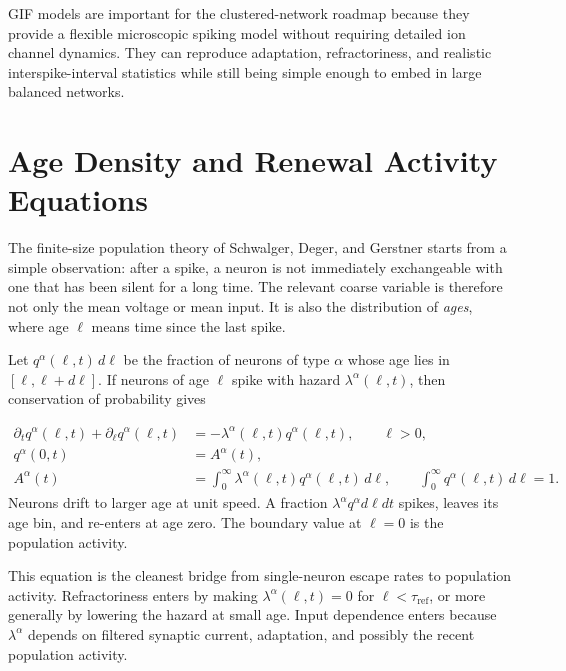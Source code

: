 GIF models are important for the clustered-network roadmap because they
provide a flexible microscopic spiking model without requiring detailed ion
channel dynamics. They can reproduce adaptation, refractoriness, and realistic
interspike-interval statistics while still being simple enough to embed in large
balanced networks.

\section{Age Density and Renewal Activity Equations}
\label{sec:age-density-renewal}

The finite-size population theory of Schwalger, Deger, and Gerstner
\citep{schwalgerDegerGerstner2017towards} starts from a simple observation:
after a spike, a neuron is not immediately exchangeable with one that has been
silent for a long time. The relevant coarse variable is therefore not only the
mean voltage or mean input. It is also the distribution of \emph{ages}, where
age \(\ell\) means time since the last spike.

Let \(q^\alpha(\ell,t)\,d\ell\) be the fraction of neurons of type \(\alpha\)
whose age lies in \([\ell,\ell+d\ell]\). If neurons of age \(\ell\) spike with
hazard \(\lambda^\alpha(\ell,t)\), then conservation of probability gives
%
\begin{keyequation}
\begin{align}
  \partial_t q^\alpha(\ell,t)
  + \partial_\ell q^\alpha(\ell,t)
  &=
  -\lambda^\alpha(\ell,t)q^\alpha(\ell,t),
  \qquad \ell>0,
  \label{eq:ch03-age-density-pde}
  \\
  q^\alpha(0,t)
  &=
  A^\alpha(t),
  \label{eq:ch03-age-density-boundary}
  \\
  A^\alpha(t)
  &=
  \int_0^\infty
  \lambda^\alpha(\ell,t)q^\alpha(\ell,t)\,d\ell,
  \qquad
  \int_0^\infty q^\alpha(\ell,t)\,d\ell=1.
  \label{eq:ch03-age-density-activity}
\end{align}
\tcblower
Neurons drift to larger age at unit speed. A fraction
\(\lambda^\alpha q^\alpha d\ell dt\) spikes, leaves its age bin, and re-enters
at age zero. The boundary value at \(\ell=0\) is the population activity.
\end{keyequation}

This equation is the cleanest bridge from single-neuron escape rates to
population activity. Refractoriness enters by making
\(\lambda^\alpha(\ell,t)=0\) for \(\ell<\tau_{\mathrm{ref}}\), or more
generally by lowering the hazard at small age. Input dependence enters because
\(\lambda^\alpha\) depends on filtered synaptic current, adaptation, and
possibly the recent population activity.

